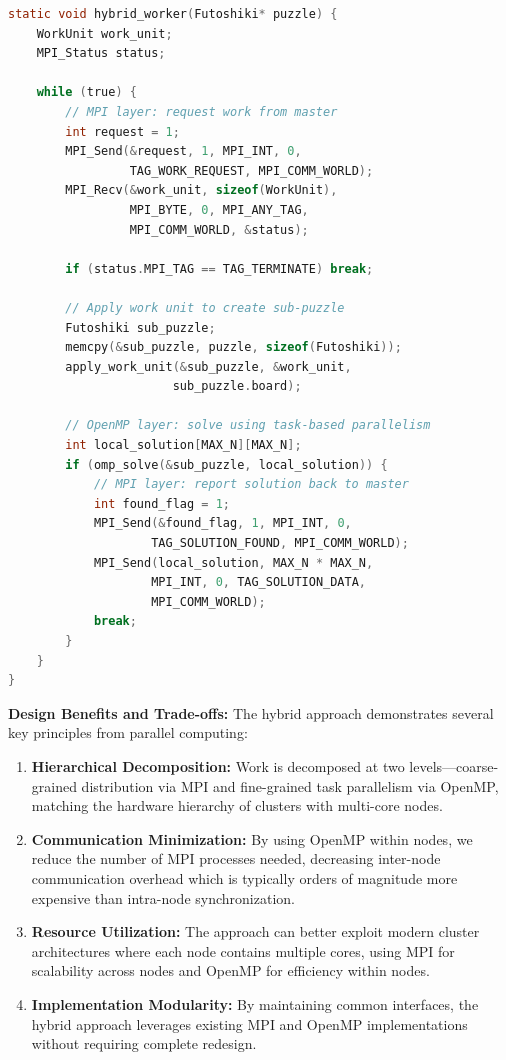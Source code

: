 \begin{lstlisting}[language=C, caption=Hybrid worker combining MPI and OpenMP, label={listing:hybrid_worker}]
static void hybrid_worker(Futoshiki* puzzle) {
    WorkUnit work_unit;
    MPI_Status status;
    
    while (true) {
        // MPI layer: request work from master
        int request = 1;
        MPI_Send(&request, 1, MPI_INT, 0, 
                 TAG_WORK_REQUEST, MPI_COMM_WORLD);
        MPI_Recv(&work_unit, sizeof(WorkUnit), 
                 MPI_BYTE, 0, MPI_ANY_TAG, 
                 MPI_COMM_WORLD, &status);
        
        if (status.MPI_TAG == TAG_TERMINATE) break;
        
        // Apply work unit to create sub-puzzle
        Futoshiki sub_puzzle;
        memcpy(&sub_puzzle, puzzle, sizeof(Futoshiki));
        apply_work_unit(&sub_puzzle, &work_unit, 
                       sub_puzzle.board);
        
        // OpenMP layer: solve using task-based parallelism
        int local_solution[MAX_N][MAX_N];
        if (omp_solve(&sub_puzzle, local_solution)) {
            // MPI layer: report solution back to master
            int found_flag = 1;
            MPI_Send(&found_flag, 1, MPI_INT, 0, 
                    TAG_SOLUTION_FOUND, MPI_COMM_WORLD);
            MPI_Send(local_solution, MAX_N * MAX_N, 
                    MPI_INT, 0, TAG_SOLUTION_DATA, 
                    MPI_COMM_WORLD);
            break;
        }
    }
}
\end{lstlisting}

\textbf{Design Benefits and Trade-offs:}
The hybrid approach demonstrates several key principles from parallel computing:

\begin{enumerate}
    \item \textbf{Hierarchical Decomposition:} Work is decomposed at two levels—coarse-grained distribution via MPI and fine-grained task parallelism via OpenMP, matching the hardware hierarchy of clusters with multi-core nodes.
    
    \item \textbf{Communication Minimization:} By using OpenMP within nodes, we reduce the number of MPI processes needed, decreasing inter-node communication overhead which is typically orders of magnitude more expensive than intra-node synchronization.
    
    \item \textbf{Resource Utilization:} The approach can better exploit modern cluster architectures where each node contains multiple cores, using MPI for scalability across nodes and OpenMP for efficiency within nodes.
    
    \item \textbf{Implementation Modularity:} By maintaining common interfaces, the hybrid approach leverages existing MPI and OpenMP implementations without requiring complete redesign.
\end{enumerate}

